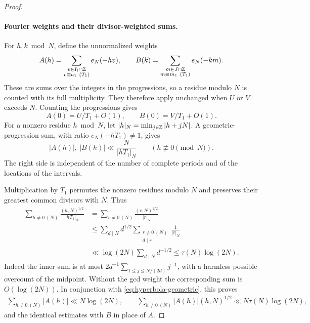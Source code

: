 \begin{proof}
\paragraph{Fourier weights and their divisor-weighted sums.}
For $h,k\bmod N$, define the unnormalized weights
\begin{equation}
\label{eq:hyperbola-fourier-weights}
 A(h)=\sum_{\substack{v\in I_l\cap\Z\\v\equiv a_1\ (T_1)}}e_N(-hv),
 \qquad
 B(k)=\sum_{\substack{m\in J\cap\Z\\m\equiv m_1\ (T_1)}}e_N(-km).
\end{equation}
These are sums over the integers in the progressions, so a residue
modulo $N$ is counted with its full multiplicity.  They therefore apply
unchanged when $U$ or $V$ exceeds $N$.  Counting the progressions gives
\begin{equation}
\label{eq:hyperbola-zero-weights}
 A(0)=U/T_1+O(1),\qquad B(0)=V/T_1+O(1).
\end{equation}
For a nonzero residue $h\bmod N$, let
$|h|_N=\min_{j\in\mathbb Z}|h+jN|$.  A geometric-progression sum, with ratio
$e_N(-hT_1)\ne1$, gives
\begin{equation}
\label{eq:hyperbola-geometric}
 |A(h)|,\ |B(h)|\ll\frac{N}{|hT_1|_N}\qquad(h\not\equiv0\pmod N).
\end{equation}
The right side is independent of the number of complete periods and
of the locations of the intervals.

Multiplication by $T_1$ permutes the nonzero residues modulo $N$ and
preserves their greatest common divisors with $N$.  Thus
\begin{equation}
\label{eq:hyperbola-gcd-sum}
\begin{split}
 \sum_{h\ne0\ (N)}\frac{(h,N)^{1/2}}{|hT_1|_N}
 &=\sum_{r\ne0\ (N)}\frac{(r,N)^{1/2}}{|r|_N}\\
 &\le\sum_{d\mid N}d^{1/2}
       \sum_{\substack{r\ne0\ (N)\\d\mid r}}\frac1{|r|_N}\\
 &\ll\log(2N)\sum_{d\mid N}d^{-1/2}
 \le\tau(N)\log(2N).
\end{split}
\end{equation}
Indeed the inner sum is at most
$2d^{-1}\sum_{1\le j\le N/(2d)}j^{-1}$, with a harmless possible
overcount of the midpoint.  Without the gcd weight the corresponding
sum is $O(\log(2N))$.  In conjunction with
\eqref{eq:hyperbola-geometric}, this proves
\begin{equation}
\label{eq:hyperbola-fourier-sums}
\begin{gathered}
 \sum_{h\ne0\ (N)}|A(h)|\ll N\log(2N),\qquad
 \sum_{h\ne0\ (N)}|A(h)|(h,N)^{1/2}
       \ll N\tau(N)\log(2N),
\end{gathered}
\end{equation}
and the identical estimates with $B$ in place of $A$.


\end{proof}
